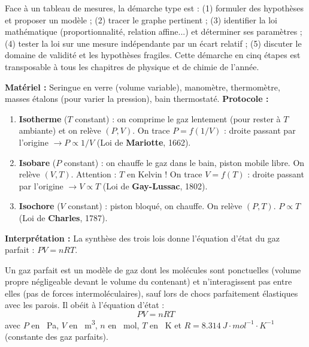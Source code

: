 \documentclass[11pt]{article}
\newcommand{\cle}[1]{{\popxbold\color{popdark}#1}}
\newcounter{popsec}
\newcounter{popsub}
\newcommand{\courssub}[1]{%
  \stepcounter{popsub}%
  \par\vspace{9pt}\noindent{\popxbold\fontsize{11.5}{13}\selectfont\color{popink}{\color{poporange}\thepopsec.\thepopsub}\hspace{6pt}#1}\par\nopagebreak\vspace{4pt}
}
\begin{document}
\begin{attention}
Face à un tableau de mesures, la démarche type est : (1) formuler des hypothèses et proposer un modèle ; (2) tracer le graphe pertinent ; (3) identifier la loi mathématique (proportionnalité, relation affine...) et déterminer ses paramètres ; (4) tester la loi sur une mesure indépendante par un écart relatif ; (5) discuter le domaine de validité et les hypothèses fragiles. Cette démarche en cinq étapes est transposable à tous les chapitres de physique et de chimie de l'année.
\end{attention}

\courssub{Exemple 2 : La loi des gaz parfaits}

\begin{experience}
\textbf{Matériel :} Seringue en verre (volume variable), manomètre, thermomètre, masses étalons (pour varier la pression), bain thermostaté.
\textbf{Protocole :}
\begin{enumerate}
\item \textbf{Isotherme} ($T$ constant) : on comprime le gaz lentement (pour rester à $T$ ambiante) et on relève $(P, V)$. On trace $P = f(1/V)$ : droite passant par l'origine $\rightarrow P \propto 1/V$ (Loi de \textbf{Mariotte}, 1662).
\item \textbf{Isobare} ($P$ constant) : on chauffe le gaz dans le bain, piston mobile libre. On relève $(V, T)$. Attention : $T$ en Kelvin ! On trace $V = f(T)$ : droite passant par l'origine $\rightarrow V \propto T$ (Loi de \textbf{Gay-Lussac}, 1802).
\item \textbf{Isochore} ($V$ constant) : piston bloqué, on chauffe. On relève $(P, T)$. $P \propto T$ (Loi de \textbf{Charles}, 1787).
\end{enumerate}
\textbf{Interprétation :} La synthèse des trois lois donne l'équation d'état du \cle{gaz parfait} : $PV = nRT$.
\end{experience}

\begin{definition}
Un gaz parfait est un modèle de gaz dont les molécules sont ponctuelles (volume propre négligeable devant le volume du contenant) et n'interagissent pas entre elles (pas de forces intermoléculaires), sauf lors de chocs parfaitement élastiques avec les parois. Il obéit à l'équation d'état :
\[ PV = nRT \]
avec $P$ en \SI{}{Pa}, $V$ en \SI{}{m^3}, $n$ en \SI{}{mol}, $T$ en \SI{}{K} et $R = \SI{8,314}{J\cdot mol^{-1}\cdot K^{-1}}$ (constante des gaz parfaits).
\end{definition}
\end{document}
